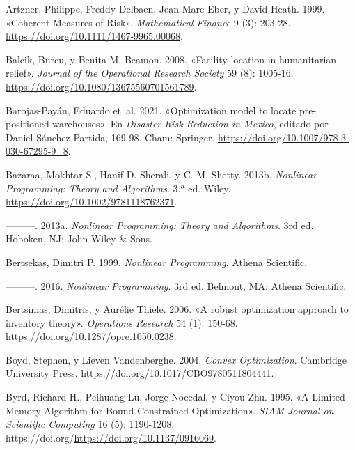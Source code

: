 \documentclass[
  spanish,
  us-letterpaper,
]{scrreprt}
\newlength{\cslhangindent}
\newenvironment{CSLReferences}[2] %
 {\begin{list}{}{%
  \setlength{\itemindent}{0pt}
  \setlength{\leftmargin}{0pt}
  \setlength{\parsep}{0pt}
  \ifodd #1
   \setlength{\leftmargin}{\cslhangindent}
   \setlength{\itemindent}{-1\cslhangindent}
  \fi
  \setlength{\itemsep}{#2\baselineskip}}}
 {\end{list}}
\numberwithin{equation}{section}
\begin{document}
\label{refs}
\begin{CSLReferences}{1}{0}
Artzner, Philippe, Freddy Delbaen, Jean-Marc Eber, y David Heath. 1999.
{«Coherent Measures of Risk»}. \emph{Mathematical Finance} 9 (3):
203-28. \url{https://doi.org/10.1111/1467-9965.00068}.

Balcik, Burcu, y Benita M. Beamon. 2008. {«Facility location in
humanitarian relief»}. \emph{Journal of the Operational Research
Society} 59 (8): 1005-16.
\url{https://doi.org/10.1080/13675560701561789}.

Barojas-Payán, Eduardo et~al. 2021. {«Optimization model to locate
pre-positioned warehouses»}. En \emph{Disaster Risk Reduction in
Mexico}, editado por Daniel Sánchez-Partida, 169-98. Cham: Springer.
\url{https://doi.org/10.1007/978-3-030-67295-9_8}.

Bazaraa, Mokhtar S., Hanif D. Sherali, y C. M. Shetty. 2013b.
\emph{Nonlinear Programming: Theory and Algorithms}. 3.ª ed. Wiley.
\url{https://doi.org/10.1002/9781118762371}.

---------. 2013a. \emph{Nonlinear Programming: Theory and Algorithms}.
3rd ed. Hoboken, NJ: John Wiley \& Sons.

Bertsekas, Dimitri P. 1999. \emph{Nonlinear Programming}. Athena
Scientific.

---------. 2016. \emph{Nonlinear Programming}. 3rd ed. Belmont, MA:
Athena Scientific.

Bertsimas, Dimitris, y Aurélie Thiele. 2006. {«A robust optimization
approach to inventory theory»}. \emph{Operations Research} 54 (1):
150-68. \url{https://doi.org/10.1287/opre.1050.0238}.

Boyd, Stephen, y Lieven Vandenberghe. 2004. \emph{Convex Optimization}.
Cambridge University Press.
\url{https://doi.org/10.1017/CBO9780511804441}.

Byrd, Richard H., Peihuang Lu, Jorge Nocedal, y Ciyou Zhu. 1995. {«A
Limited Memory Algorithm for Bound Constrained Optimization»}.
\emph{SIAM Journal on Scientific Computing} 16 (5): 1190-1208.
https://doi.org/\url{https://doi.org/10.1137/0916069}.


\end{CSLReferences}
\end{document}
